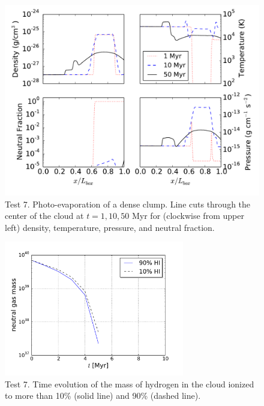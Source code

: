 \begin{figure}[t]
\centerline{\hfill
  \includegraphics[scale=0.6, trim=1.0cm 0.5cm 1.0cm 0.5cm]{test7_profiles_K.pdf}
  \hfill}
  \caption{Test 7. Photo-evaporation of a dense clump. Line cuts through the center of the cloud at $t=1, 10, 50$ Myr for (clockwise from upper left) density, temperature, pressure, and neutral fraction. }
  \label{fig:test7_profiles}
\end{figure}

\begin{figure}[t]
\centerline{\hfill
  \includegraphics[width=0.7\textwidth]{test7_ionization_history2.pdf}
  \hfill}
  \caption{Test 7. Time evolution of the mass of hydrogen in the cloud ionized to more than 10\% (solid line) and 90\% (dashed line). }
  \label{fig:time-evol}
\end{figure}


